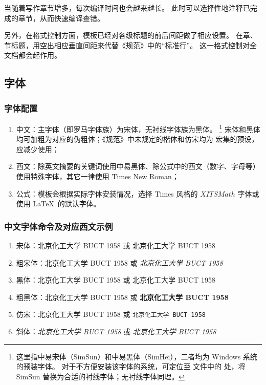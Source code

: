 当随着写作章节增多，每次编译时间也会越来越长。
此时可以选择性地注释已完成的章节，从而快速编译查错。

另外，在格式控制方面，模板已经对各级标题的前后间距做了相应设置。
在章、节标题，用空出相应垂直间距来代替《规范》中的“标准行”。
这一格式控制对全文档都会起作用。
\subsection{字体}
\subsubsection{字体配置}
\begin{enumerate}
	\item 中文：主字体（即罗马字体族）为宋体，无衬线字体族为黑体。%
	\footnote{这里指中易宋体（SimSun）和中易黑体（SimHei），二者均为 Windows 系统的预装字体。
	对于不方便安装该字体的系统，可定位至 
	文件中的  处，将 SimSun 替换为合适的衬线字体；无衬线字体同理。}
	宋体和黑体均可加粗为对应的伪粗体；《规范》中未规定的楷体和仿宋均为  宏集的预设，应减少使用；
	\item 西文：除英文摘要的关键词使用中易黑体、除公式中的西文（数字、字母等）使用特殊字体，其它一律使用 Times New Roman；
	\item 公式：模板会根据实际字体安装情况，选择 Times 风格的 $XITSMath$ 字体或使用 \LaTeX\ 的默认字体。
\end{enumerate}

\subsubsection{中文字体命令及对应西文示例}
\begin{enumerate}
	\item 宋体：北京化工大学 BUCT 1958 或 \textrm{北京化工大学 BUCT 1958}
	\item 粗宋体：{\bfsong 北京化工大学 BUCT 1958} 或 \emph{北京化工大学 BUCT 1958}
	\item 黑体：{\heiti 北京化工大学 BUCT 1958} 或 \textsf{北京化工大学 BUCT 1958}
	\item 粗黑体：{\bfhei 北京化工大学 BUCT 1958} 或 \textsf{\bfseries 北京化工大学 BUCT 1958}
	\item 仿宋：{\ttfamily 北京化工大学 BUCT 1958} 或 \texttt{北京化工大学 BUCT 1958}
	\item 斜体：{\itshape 北京化工大学 BUCT 1958} 或 \textit{北京化工大学 BUCT 1958}
\end{enumerate}
